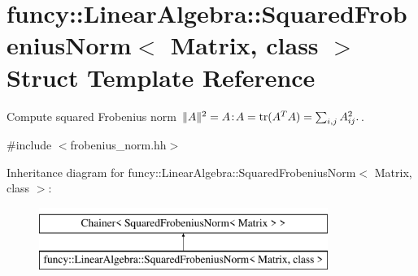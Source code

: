 \hypertarget{structfuncy_1_1LinearAlgebra_1_1SquaredFrobeniusNorm}{\section{funcy\-:\-:Linear\-Algebra\-:\-:Squared\-Frobenius\-Norm$<$ Matrix, class $>$ Struct Template Reference}
\label{structfuncy_1_1LinearAlgebra_1_1SquaredFrobeniusNorm}
}


Compute squared Frobenius norm $ \|A\|^2 = A\negthinspace : \negthinspace A = \mathrm{tr}(A^TA) = \sum_{i,j} A_{ij}^2. $.  




{\ttfamily \#include $<$frobenius\-\_\-norm.\-hh$>$}

Inheritance diagram for funcy\-:\-:Linear\-Algebra\-:\-:Squared\-Frobenius\-Norm$<$ Matrix, class $>$\-:\begin{figure}[H]
\begin{center}
\leavevmode
\includegraphics[height=2.000000cm]{structfuncy_1_1LinearAlgebra_1_1SquaredFrobeniusNorm}
\end{center}
\end{figure}
